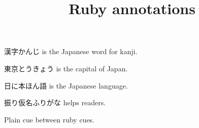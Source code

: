 \documentclass[11pt,a4paper]{article}
\title{Ruby annotations}
\begin{document}
\maketitle

漢字かんじ is the Japanese word for kanji.

東京とうきょう is the capital of Japan.

日に本ほん語 is the Japanese language.

振り仮名ふりがな helps readers.

Plain cue between ruby cues.
\end{document}
